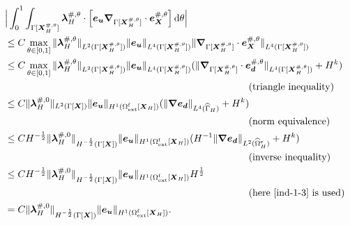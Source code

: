\documentclass[11pt,reqno]{amsart}
\theoremstyle{definition}
\theoremstyle{plain}
\numberwithin{theorem}{section}
\numberwithin{proposition}{section}
\numberwithin{lemma}{section}
\numberwithin{equation}{section}
\newcommand{\bs}[1]{\boldsymbol{#1}}
\newcommand{\uu}[1]  {{\bs{#1}} }
\newcommand{\grad}   { \uu{\nabla}    }
\def\d{\mathrm{d}}
\renewcommand{\(}{\bigl(}
\renewcommand{\)}{\bigr)}
\begin{document}
\begin{align}\label{lambdaH-eu}
&\Big|\int_0^1 \int_{\Gamma[{\bs X}_H^{\#,\theta}]} {\bs \lambda}_H^{\#,\theta} \cdot 
\Big[ {\bs e}_{\bs u}  \grad_{\Gamma[{\bs X}_H^{\#,\theta}]}\cdot {\bs e}_{\bs X}^{\#,\theta} \Big] \, \d\theta \Big| \notag\\
&\le C \max_{\theta\in[0,1]} \|{\bs \lambda}_H^{\#,\theta}\|_{L^2(\Gamma[{\bs X}_H^{\#,\theta}])} 
\|{\bs e}_{\bs u}\|_{L^4(\Gamma[{\bs X}_H^{\#,\theta}])} 
\|\grad_{\Gamma[{\bs X}_H^{\#,\theta}]}\cdot {\bs e}_{\bs X}^{\#,\theta}\|_{L^4(\Gamma[{\bs X}_H^{\#,\theta}])} \notag\\
&\le C\max_{\theta\in[0,1]}  \|{\bs \lambda}_H^{\#,\theta}\|_{L^2(\Gamma[{\bs X}_H^{\#,\theta}])} 
\|{\bs e}_{\bs u}\|_{L^4(\Gamma[{\bs X}_H^{\#,\theta}])} 
(\|\grad_{\Gamma[{\bs X}_H^{\#,\theta}]}\cdot {\bs e}_{\bs d}^{\#,\theta}\|_{L^4(\Gamma[{\bs X}_H^{\#,\theta}])} + H^k) \notag\\
&\hspace{250pt}\mbox{(triangle inequality)}\notag\\
&\le C\|{\bs \lambda}_H^{\#,0}\|_{L^2(\Gamma[\bs X])} 
\|{\bs e}_{\bs u}\|_{H^1(\Omega^{\rm f}_{\rm ext}[{\bs X}_H])} 
(\|\grad {\bs e}_{\bs d}\|_{L^4(\widehat\Gamma_H)} + H^k) \notag\\
&\hspace{250pt}\mbox{(norm equivalence)}\notag\\
&\le CH^{-\frac12}\|{\bs \lambda}_H^{\#,0}\|_{H^{-\frac12}(\Gamma[\bs X])} 
\|{\bs e}_{\bs u}\|_{H^1(\Omega^{\rm f}_{\rm ext}[{\bs X}_H])} 
(H^{-1}\|\grad {\bs e}_{\bs d}\|_{L^2(\widehat{\Omega}_H^{\rm s})} + H^k) \notag\\
&\hspace{250pt}\mbox{(inverse inequality)}\notag\\
&\le CH^{-\frac12}\|{\bs \lambda}_H^{\#,0}\|_{H^{-\frac12}(\Gamma[\bs X])} 
\|{\bs e}_{\bs u}\|_{H^1(\Omega^{\rm f}_{\rm ext}[{\bs X}_H])} H^{\frac12} \notag\\
&\hspace{250pt}\mbox{(here \eqref{ind-1-3} is used)}\notag\\
&= C\|{\bs \lambda}_H^{\#,0}\|_{H^{-\frac12}(\Gamma[\bs X])} 
\|{\bs e}_{\bs u}\|_{H^1(\Omega^{\rm f}_{\rm ext}[{\bs X}_H])} .
\end{align}
\end{document}
